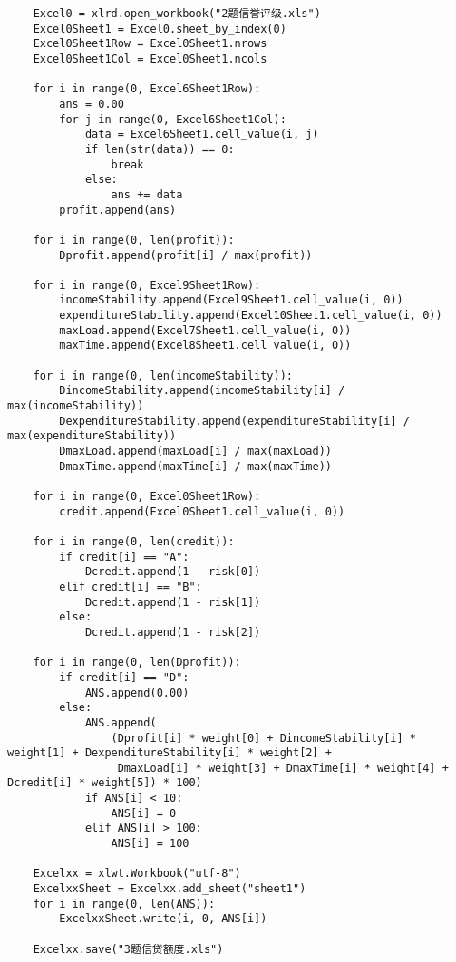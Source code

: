 \documentclass[dvipsnames,withoutpreface,bwprint]{cumcmthesis}
\begin{document}
\begin{appendices}
\begin{lstlisting}
    Excel0 = xlrd.open_workbook("2题信誉评级.xls")
    Excel0Sheet1 = Excel0.sheet_by_index(0)
    Excel0Sheet1Row = Excel0Sheet1.nrows
    Excel0Sheet1Col = Excel0Sheet1.ncols

    for i in range(0, Excel6Sheet1Row):
        ans = 0.00
        for j in range(0, Excel6Sheet1Col):
            data = Excel6Sheet1.cell_value(i, j)
            if len(str(data)) == 0:
                break
            else:
                ans += data
        profit.append(ans)

    for i in range(0, len(profit)):
        Dprofit.append(profit[i] / max(profit))

    for i in range(0, Excel9Sheet1Row):
        incomeStability.append(Excel9Sheet1.cell_value(i, 0))
        expenditureStability.append(Excel10Sheet1.cell_value(i, 0))
        maxLoad.append(Excel7Sheet1.cell_value(i, 0))
        maxTime.append(Excel8Sheet1.cell_value(i, 0))

    for i in range(0, len(incomeStability)):
        DincomeStability.append(incomeStability[i] / max(incomeStability))
        DexpenditureStability.append(expenditureStability[i] / max(expenditureStability))
        DmaxLoad.append(maxLoad[i] / max(maxLoad))
        DmaxTime.append(maxTime[i] / max(maxTime))

    for i in range(0, Excel0Sheet1Row):
        credit.append(Excel0Sheet1.cell_value(i, 0))

    for i in range(0, len(credit)):
        if credit[i] == "A":
            Dcredit.append(1 - risk[0])
        elif credit[i] == "B":
            Dcredit.append(1 - risk[1])
        else:
            Dcredit.append(1 - risk[2])

    for i in range(0, len(Dprofit)):
        if credit[i] == "D":
            ANS.append(0.00)
        else:
            ANS.append(
                (Dprofit[i] * weight[0] + DincomeStability[i] * weight[1] + DexpenditureStability[i] * weight[2] +
                 DmaxLoad[i] * weight[3] + DmaxTime[i] * weight[4] + Dcredit[i] * weight[5]) * 100)
            if ANS[i] < 10:
                ANS[i] = 0
            elif ANS[i] > 100:
                ANS[i] = 100

    Excelxx = xlwt.Workbook("utf-8")
    ExcelxxSheet = Excelxx.add_sheet("sheet1")
    for i in range(0, len(ANS)):
        ExcelxxSheet.write(i, 0, ANS[i])

    Excelxx.save("3题信贷额度.xls")
\end{lstlisting}
\end{appendices}
\end{document}
